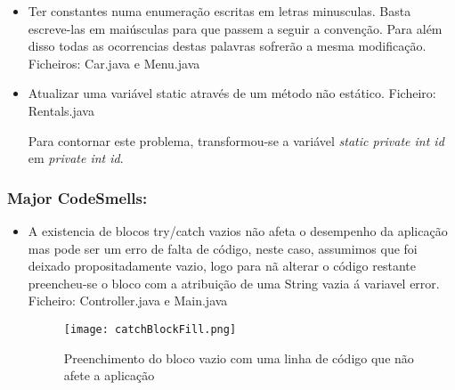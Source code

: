 \begin{itemize}
\item Ter constantes numa enumeração escritas em letras minusculas. Basta escreve-las em maiúsculas para que passem a seguir a convenção. Para além disso todas as ocorrencias destas palavras sofrerão a mesma modificação.
 Ficheiros: Car.java e Menu.java\newline
\end{itemize}

\begin{itemize}
\item Atualizar uma variável static através de um método não estático.\newline
 Ficheiro: Rentals.java\newline
\par Para contornar este problema, transformou-se a variável \textit{static private int id} em \textit{private int id}.
\end{itemize}




\subsubsection{Major CodeSmells:}

\begin{itemize}
\item A existencia de blocos try/catch vazios não afeta o desempenho da aplicação mas pode ser um erro de falta de código, neste caso, assumimos que foi deixado propositadamente vazio, logo para nã alterar o código restante preencheu-se o bloco com a atribuição de uma String vazia á variavel error.\newline
 Ficheiro: Controller.java e Main.java\newline

 \begin{figure}[H]

  \centering

  \texttt{[image: catchBlockFill.png]}

  \caption {Preenchimento do bloco vazio com uma linha de código que não afete a aplicação}

  \label {fig10}

\end{figure}
\end{itemize}


